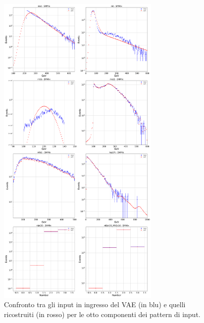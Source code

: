 \begin{figure}[h!]
	\centering
	\includegraphics[width=0.70\textwidth]{figs/risultati_simulazione/ricostruzione.png}
	\caption{Confronto tra gli input in ingresso del VAE (in blu) e quelli ricostruiti (in rosso) per le otto componenti dei pattern di input.}
	\label{ricostruzione}
\end{figure}

\newpage

